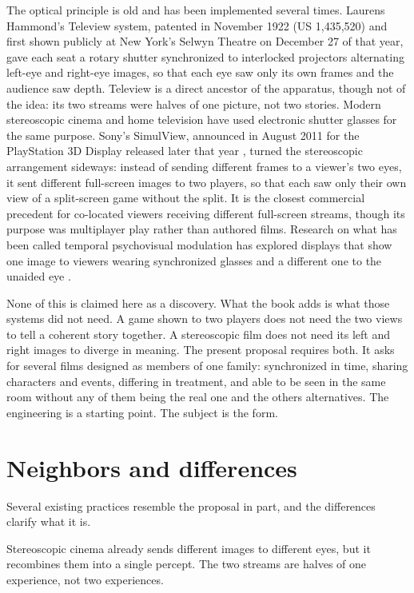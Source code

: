 The optical principle is old and has been implemented several times. Laurens Hammond's Teleview system, patented in November 1922 (US 1,435,520) \cite{hammond1922} and first shown publicly at New York's Selwyn Theatre on December 27 of that year, gave each seat a rotary shutter synchronized to interlocked projectors alternating left-eye and right-eye images, so that each eye saw only its own frames and the audience saw depth. Teleview is a direct ancestor of the apparatus, though not of the idea: its two streams were halves of one picture, not two stories. Modern stereoscopic cinema and home television have used electronic shutter glasses for the same purpose. Sony's SimulView, announced in August 2011 for the PlayStation 3D Display released later that year \cite{simulview}, turned the stereoscopic arrangement sideways: instead of sending different frames to a viewer's two eyes, it sent different full-screen images to two players, so that each saw only their own view of a split-screen game without the split. It is the closest commercial precedent for co-located viewers receiving different full-screen streams, though its purpose was multiplayer play rather than authored films. Research on what has been called temporal psychovisual modulation has explored displays that show one image to viewers wearing synchronized glasses and a different one to the unaided eye \cite{wuzhai}.

None of this is claimed here as a discovery. What the book adds is what those systems did not need. A game shown to two players does not need the two views to tell a coherent story together. A stereoscopic film does not need its left and right images to diverge in meaning. The present proposal requires both. It asks for several films designed as members of one family: synchronized in time, sharing characters and events, differing in treatment, and able to be seen in the same room without any of them being the real one and the others alternatives. The engineering is a starting point. The subject is the form.

\section*{Neighbors and differences}

Several existing practices resemble the proposal in part, and the differences clarify what it is.

Stereoscopic cinema already sends different images to different eyes, but it recombines them into a single percept. The two streams are halves of one experience, not two experiences.

